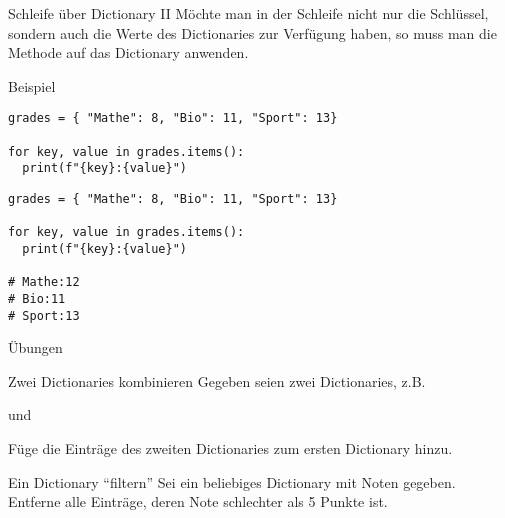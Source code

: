 \begin{fragile}
\begin{block}{Schleife über Dictionary II}
\vspace{2pt}
Möchte man in der Schleife nicht nur die Schlüssel, sondern auch die Werte des Dictionaries zur Verfügung haben, so muss man die Methode  auf das Dictionary anwenden.   
\end{block}
\vspace{12pt}
\pause 


\begin{exampleblock}{Beispiel}
\vspace{2pt}
\begin{overprint}
\begin{verbatim}
grades = { "Mathe": 8, "Bio": 11, "Sport": 13}

for key, value in grades.items():
  print(f"{key}:{value}")
\end{verbatim}
\begin{verbatim}
grades = { "Mathe": 8, "Bio": 11, "Sport": 13}

for key, value in grades.items():
  print(f"{key}:{value}")

# Mathe:12
# Bio:11
# Sport:13
\end{verbatim}
\end{overprint}
\end{exampleblock}
\end{fragile}

\begin{frame}{Übungen}

\begin{block}{Zwei Dictionaries kombinieren}
	\vspace{2pt}
Gegeben seien zwei Dictionaries, z.B.  


und 


Füge die Einträge des zweiten Dictionaries zum ersten Dictionary hinzu. 
\end{block}

\pause 

\vspace{12pt}

\begin{block}{Ein Dictionary \enquote{filtern}}
\vspace{2pt}
Sei ein beliebiges Dictionary mit Noten gegeben. Entferne alle Einträge, deren Note schlechter als 5 Punkte ist. 
\end{block}
\end{frame}


